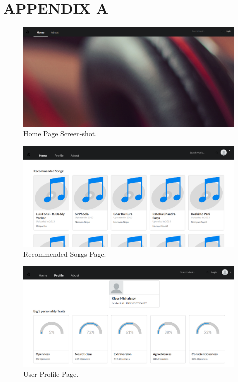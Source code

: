 \newpage
\section*{APPENDIX A}

\begin{figure}[h]
  \centering
    \includegraphics[width=1\textwidth]{fig/home_screenshot.png}
    \caption{Home Page Screen-shot.}
\end{figure}

\newpage
\begin{figure}[h]
  \centering
    \includegraphics[width=1\textwidth]{fig/recommended_songs.png}
    \caption{Recommended Songs Page.}
\end{figure}

\newpage
\begin{figure}[h]
  \centering
    \includegraphics[width=1\textwidth]{fig/profile_screenshot.png}
    \caption{User Profile Page.}
\end{figure}

